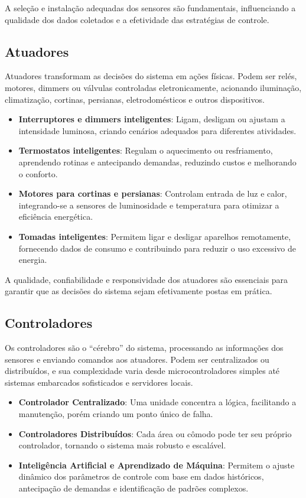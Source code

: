A seleção e instalação adequadas dos sensores são fundamentais, influenciando a qualidade dos dados coletados e a efetividade das estratégias de controle.

\subsection{Atuadores}

Atuadores transformam as decisões do sistema em ações físicas. Podem ser relés, motores, dimmers ou válvulas controladas eletronicamente, acionando iluminação, climatização, cortinas, persianas, eletrodomésticos e outros dispositivos.

\begin{itemize}
    \item \textbf{Interruptores e dimmers inteligentes}: Ligam, desligam ou ajustam a intensidade luminosa, criando cenários adequados para diferentes atividades.
    \item \textbf{Termostatos inteligentes}: Regulam o aquecimento ou resfriamento, aprendendo rotinas e antecipando demandas, reduzindo custos e melhorando o conforto.
    \item \textbf{Motores para cortinas e persianas}: Controlam entrada de luz e calor, integrando-se a sensores de luminosidade e temperatura para otimizar a eficiência energética.
    \item \textbf{Tomadas inteligentes}: Permitem ligar e desligar aparelhos remotamente, fornecendo dados de consumo e contribuindo para reduzir o uso excessivo de energia.
\end{itemize}

A qualidade, confiabilidade e responsividade dos atuadores são essenciais para garantir que as decisões do sistema sejam efetivamente postas em prática.

\subsection{Controladores}

Os controladores são o “cérebro” do sistema, processando as informações dos sensores e enviando comandos aos atuadores. Podem ser centralizados ou distribuídos, e sua complexidade varia desde microcontroladores simples até sistemas embarcados sofisticados e servidores locais.

\begin{itemize}
    \item \textbf{Controlador Centralizado}: Uma unidade concentra a lógica, facilitando a manutenção, porém criando um ponto único de falha.
    \item \textbf{Controladores Distribuídos}: Cada área ou cômodo pode ter seu próprio controlador, tornando o sistema mais robusto e escalável.
    \item \textbf{Inteligência Artificial e Aprendizado de Máquina}: Permitem o ajuste dinâmico dos parâmetros de controle com base em dados históricos, antecipação de demandas e identificação de padrões complexos.
\end{itemize}

